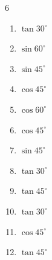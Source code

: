\begin{multicols}{6}
\begin{enumerate}

  \item $\displaystyle \tan{30^\circ}$


  \item $\displaystyle \sin{60^\circ}$


\columnbreak %

\resetques

  \item $\displaystyle \sin{45^\circ}$


  \item $\displaystyle \cos{45^\circ}$


  \item $\displaystyle \cos{60^\circ}$


  \item $\displaystyle \cos{45^\circ}$


  \item $\displaystyle \sin{45^\circ}$


  \item $\displaystyle \tan{30^\circ}$


  \item $\displaystyle \tan{45^\circ}$

        \phantom{$\displaystyle =1$}

  \item $\displaystyle \tan{30^\circ}$


  \item $\displaystyle \cos{45^\circ}$


  \item $\displaystyle \tan{45^\circ}$


\end{enumerate}
\end{multicols}
